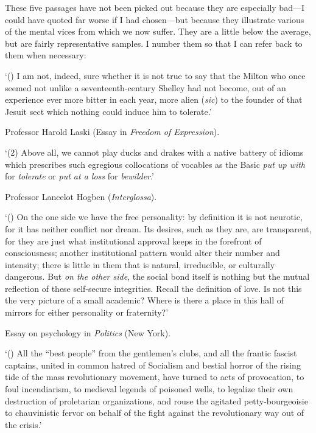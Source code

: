 These five passages have not been picked out because they are
especially bad---I could have quoted far worse if I had chosen---but
because they illustrate various of the mental vices from which we now
suffer. They are a little below the average, but are fairly
representative samples. I number them so that I can refer back to them
when necessary:

`() I am not, indeed, sure whether it is not true to say that
the Milton who once seemed not unlike a seventeenth-century Shelley
had not become, out of an experience ever more bitter in each year,
more alien (\textit{sic}) to the founder of that Jesuit sect which
nothing could induce him to tolerate.'

\begin{flushright} Professor Harold Laski (Essay in \textit{Freedom of
Expression}). \end{flushright}

`(2) Above all, we cannot play ducks and drakes with a native battery
of idioms which prescribes such egregious collocations of vocables as
the Basic \textit{put up with} for \textit{tolerate} or \textit{put at
a loss} for \textit{bewilder}.'

\begin{flushright} Professor Lancelot Hogben (\textit{Interglossa}).
\end{flushright}

`() On the one side we have the free personality: by
definition it is not neurotic, for it has neither conflict nor dream.
Its desires, such as they are, are transparent, for they are just what
institutional approval keeps in the forefront of consciousness;
another institutional pattern would alter their number and intensity;
there is little in them that is natural, irreducible, or culturally
dangerous. But \textit{on the other side}, the social bond itself is
nothing but the mutual reflection of these self-secure integrities.
Recall the definition of love. Is not this the very picture of a small
academic? Where is there a place in this hall of mirrors for either
personality or fraternity?'

\begin{flushright} Essay on psychology in \textit{Politics} (New
York). \end{flushright}

`() All the ``best people'' from the gentlemen's clubs, and all
the frantic fascist captains, united in common hatred of Socialism and
bestial horror of the rising tide of the mass revolutionary movement,
have turned to acts of provocation, to foul incendiarism, to medieval
legends of poisoned wells, to legalize their own destruction of
proletarian organizations, and rouse the agitated petty-bourgeoisie to
chauvinistic fervor on behalf of the fight against the revolutionary
way out of the crisis.'

